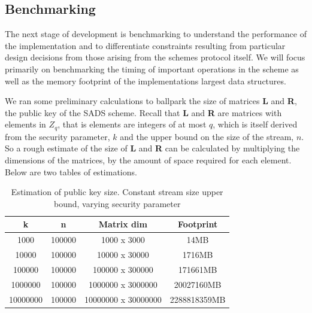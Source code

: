 \documentclass[11pt, letterpaper, oneside]{article}
\begin{document}
	\subsection{ Benchmarking }

	The next stage of development is benchmarking to understand the performance of the implementation and to differentiate constraints resulting from particular design decisions from those arising from the schemes protocol itself.
	We will focus primarily on benchmarking the timing of important operations in the scheme as well as the memory footprint of the implementations largest data structures.

	We ran some preliminary calculations to ballpark the size of matrices \textbf{L} and \textbf{R}, the public key of the SADS scheme.
	Recall that \textbf{L} and \textbf{R} are matrices with elements in $Z_q$, that is elements are integers of at most $q$, which is itself derived from the security parameter, $k$ and the upper bound on the size of the stream, $n$.
	So a rough estimate of the size of \textbf{L} and \textbf{R} can be calculated by multiplying the dimensions of the matrices, by the amount of space required for each element.
	Below are two tables of estimations.

	\begin{table}[h]
	\centering

		\begin{tabular} { c | c | c | c}

		k & n & Matrix dim & Footprint\\ \hline
		1000&100000&1000 x 3000&14MB\\
		10000&100000&10000 x 30000&1716MB\\
		100000&100000&100000 x 300000&171661MB\\
		1000000&100000&1000000 x 3000000&20027160MB\\
		10000000&100000&10000000 x 30000000&2288818359MB\\
		\end{tabular}

	\caption{Estimation of public key size.  Constant stream size upper bound, varying security parameter }
	\label{tab:pub-key-k}
	\end{table}
\end{document}
